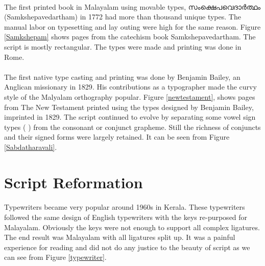 \documentclass[10pt]{article}
\begin{document}
\paragraph{}
The first printed book in Malayalam using movable types, {\manjari സംക്ഷെപവെദാർത്ഥം} (Samkshepavedartham) in 1772 had more than thousand unique types\cite{babucherian}. The manual labor on typesetting and lay outing were high for the same reason. Figure \ref{Samkshepam} shows pages from the catechism book Samkshepavedartham. The script is mostly rectangular. The types were made and printing was done in Rome. 

\paragraph{}
The first native type casting and printing was done by Benjamin Bailey, an Anglican missionary in 1829\cite{babucherian}.  His contributions as a typographer made the curvy style of the Malyalam orthography popular\cite{gupthannair}. Figure \ref{newtestament}, shows pages from The New Testament printed using the types designed by Benjamin Bailey, imprinted in 1829\cite{babucherian}. The script continued to evolve by separating some vowel sign types ({ }) from the consonant or conjunct grapheme. Still the richness of conjuncts and their signed forms were largely retained. It can be seen from Figure \ref{Sabdatharavali}. 




\section{Script Reformation}

\paragraph{}
Typewriters became very popular around 1960s in Kerala. These typewriters followed the same design of English typewriters with the keys re-purposed for Malayalam. Obviously the keys were not enough to support all complex ligatures. The end result was Malayalam with all ligatures split up. It was a painful experience for reading and did not do any justice to the beauty of script as we can see from Figure \ref{typewriter}.
\end{document}
